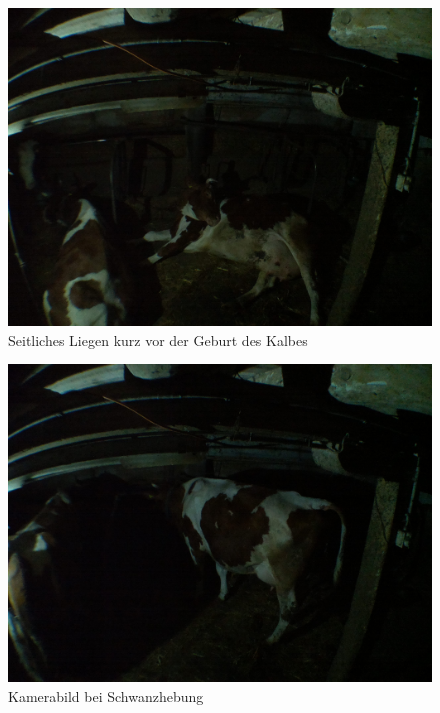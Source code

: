 \begin{figure}[h]
	\center
	\includegraphics[scale=0.075]{Grafiken/seitlichesligen.jpg}
	\caption{Seitliches Liegen kurz vor der Geburt des Kalbes} 
	\label{fig: Seitliches Liegen kurz vor der Geburt des Kalbes}
\end{figure}


\begin{figure}[h]
	\center
	\includegraphics[scale=0.075]{Grafiken/schwanhebungkamerabild.jpg}
	\caption{Kamerabild bei Schwanzhebung} 
	\label{fig: Kamerabild bei Schwanzhebung}
\end{figure}

